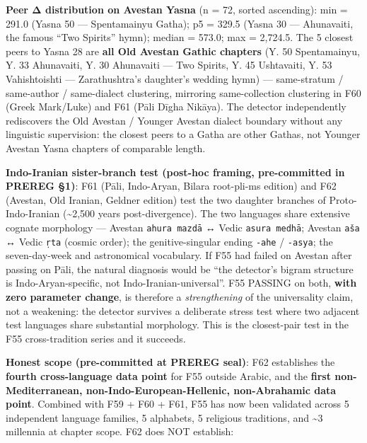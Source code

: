 \documentclass[
]{article}
\begin{document}
\textbf{Peer Δ distribution on Avestan Yasna} (n = 72, sorted
ascending): min = 291.0 (Yasna 50 --- Spentamainyu Gatha); p5 = 329.5
(Yasna 30 --- Ahunavaiti, the famous ``Two Spirits'' hymn); median =
573.0; max = 2,724.5. The 5 closest peers to Yasna 28 are \textbf{all
Old Avestan Gathic chapters} (Y. 50 Spentamainyu, Y. 33 Ahunavaiti, Y.
30 Ahunavaiti --- Two Spirits, Y. 45 Ushtavaiti, Y. 53 Vahishtoishti ---
Zarathushtra's daughter's wedding hymn) --- same-stratum / same-author /
same-dialect clustering, mirroring same-collection clustering in F60
(Greek Mark/Luke) and F61 (Pāli Dīgha Nikāya). The detector
independently rediscovers the Old Avestan / Younger Avestan dialect
boundary without any linguistic supervision: the closest peers to a
Gatha are other Gathas, not Younger Avestan Yasna chapters of comparable
length.

\textbf{Indo-Iranian sister-branch test (post-hoc framing, pre-committed
in PREREG §1)}: F61 (Pāli, Indo-Aryan, Bilara root-pli-ms edition) and
F62 (Avestan, Old Iranian, Geldner edition) test the two daughter
branches of Proto-Indo-Iranian (\textasciitilde2,500 years
post-divergence). The two languages share extensive cognate morphology
--- Avestan \texttt{ahura\ mazdā} ↔ Vedic \texttt{asura\ medhā}; Avestan
\texttt{aša} ↔ Vedic \texttt{ṛta} (cosmic order); the genitive-singular
ending \texttt{-ahe} / \texttt{-asya}; the seven-day-week and
astronomical vocabulary. If F55 had failed on Avestan after passing on
Pāli, the natural diagnosis would be ``the detector's bigram structure
is Indo-Aryan-specific, not Indo-Iranian-universal''. F55 PASSING on
both, \textbf{with zero parameter change}, is therefore a
\emph{strengthening} of the universality claim, not a weakening: the
detector survives a deliberate stress test where two adjacent test
languages share substantial morphology. This is the closest-pair test in
the F55 cross-tradition series and it succeeds.

\textbf{Honest scope (pre-committed at PREREG seal)}: F62 establishes
the \textbf{fourth cross-language data point} for F55 outside Arabic,
and the \textbf{first non-Mediterranean, non-Indo-European-Hellenic,
non-Abrahamic data point}. Combined with F59 + F60 + F61, F55 has now
been validated across 5 independent language families, 5 alphabets, 5
religious traditions, and \textasciitilde3 millennia at chapter scope.
F62 does NOT establish:
\end{document}
